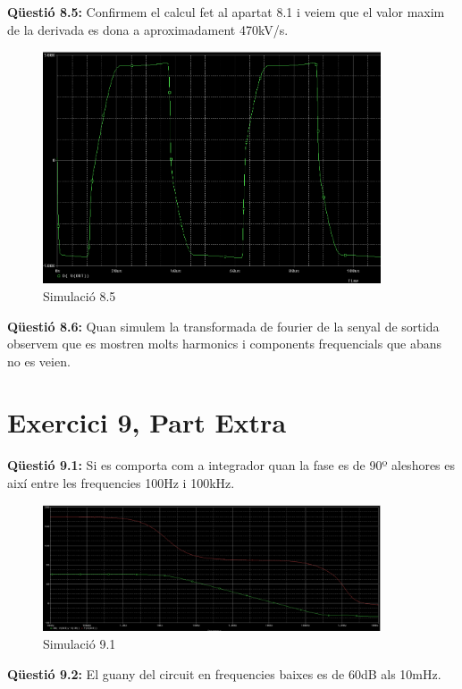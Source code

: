 \documentclass[12pt, a4papre]{article}
\begin{document}
	\textbf{Qüestió 8.5:} Confirmem el calcul fet al apartat 8.1 i veiem que el valor maxim de la derivada es dona a aproximadament 470kV/s.
	
	\begin{figure}[H]
		\begin{center}
		\includegraphics[width=100mm]{8_5.PNG}
		\caption{Simulació 8.5}
		\end{center}
	\end{figure}
	
	\textbf{Qüestió 8.6:} Quan simulem la transformada de fourier de la senyal de sortida observem que es mostren molts harmonics i components frequencials que abans no es veien.
	
	\section{Exercici 9, Part Extra} 
	
	\textbf{Qüestió 9.1:} Si es comporta com a integrador quan la fase es de 90º aleshores es així entre les frequencies 100Hz i 100kHz.
	
	\begin{figure}[H]
		\begin{center}
		\includegraphics[width=100mm]{9_1_2.PNG}
		\caption{Simulació 9.1}
		\end{center}
	\end{figure}
	
	\textbf{Qüestió 9.2:} El guany del circuit en frequencies baixes es de 60dB als 10mHz.
	
\end{document}
